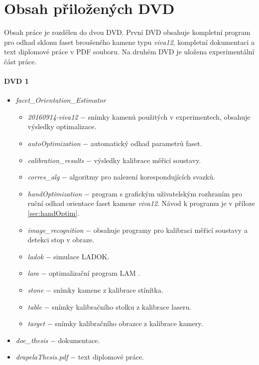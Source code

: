 \section{Obsah přiložených DVD}

Obsah práce je rozdělen do dvou DVD. První DVD obsahuje kompletní program pro odhad sklonu faset broušeného kamene typu \textit{viva12}, kompletní dokumentaci a text diplomové práce v PDF souboru. Na druhém DVD je uložena experimentální část práce.\\

\paragraph{DVD 1}
\hspace{1mm}

\begin{itemize}
	
	\item 	\textit{facet\_Orientation\_Estimator}
	\begin{itemize}
		\item \textit{20160914-viva12} $-$ snímky kamenů použitých v experimentech, obsahuje výsledky optimalizace.  		
				
		\item \textit{autoOptimization} $-$ automatický odhad parametrů faset.
		
		\item \textit{calibration\_results} $-$ výsledky kalibrace měřicí soustavy.
		
		\item \textit{corres\_alg} $-$ algoritmy pro nalezení korespondujících svazků.
		
		\item \textit{handOptimization} $-$ program s grafickým uživatelským rozhraním pro ruční odhad orientace faset kamene \textit{viva12}. Návod k programu je v příloze \ref{sec:handOptim}.
		
		\item \textit{image\_recognition} $-$ obsahuje programy pro kalibraci měřicí soustavy a detekci stop v obraze.
		
		\item \textit{ladok} $-$ simulace LADOK. 
	
		\item \textit{lam} $-$ optimalizační program LAM \cite{Bodlak2005}. 
		
		\item \textit{stone} $-$ snímky kamene z kalibrace stínítka. 
		
		\item \textit{table} $-$ snímky kalibračního stolku z kalibrace laseru.
		
		\item \textit{target} $-$ snímky kalibračního obrazce z kalibrace kamery.
		
	\end{itemize}		
	\item	\textit{doc\_thesis} $-$ dokumentace.
	
	\item 	\textit{drapelaThesis.pdf} $-$ text diplomové práce.

\end{itemize}

